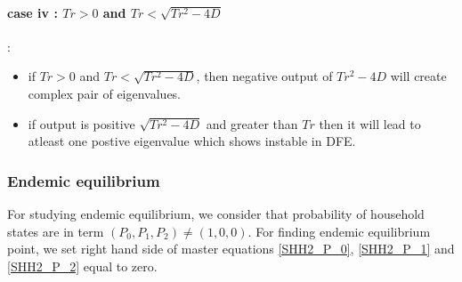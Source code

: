 \documentclass[paper=a4, fontsize=11pt, twoside, BCOR=12mm, parskip=full, listof=totoc]{scrreprt}
\begin{document}
{\paragraph*{\textbf{case iv : $ Tr > 0 $ and $Tr < \sqrt{Tr^2-4D} $ }}: 
\begin{itemize}
\item if $Tr > 0$ and $Tr < \sqrt{Tr^2 - 4D}$, then negative output of $Tr^2 - 4D$ will create complex pair of eigenvalues. 
\item if output is positive $\sqrt{Tr^2 - 4D}$ and greater than $Tr$ then it will lead to atleast one postive eigenvalue which shows instable in DFE.
\end{itemize}  

\subsubsection*{Endemic equilibrium}
For studying endemic equilibrium, we consider that probability of household states are in term \( (P_0,P_1,P_2) \neq (1, 0, 0) \). For finding endemic equilibrium point, we set right hand side of master equations \ref{SHH2_P_0}, \ref{SHH2_P_1} and \ref{SHH2_P_2} equal to zero.\\

}
\end{document}
